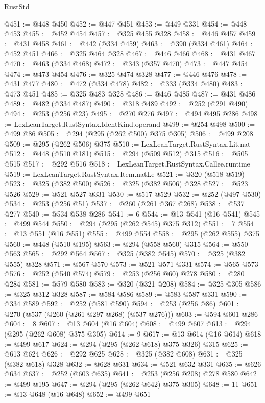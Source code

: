 \begin{lexlean}{RustStd}
\begin{coremodule}
@451 := @448 @450
@452 := @447 @451
@453 := @449 @331
@454 := @448 @453
@455 := @452 @454
@457 := @325 @455 @328
@458 := @446 @457
@459 := @431 @458
@461 := @442 (@334 @459)
@463 := @390 (@334 @461)
@464 := @452 @451
@466 := @325 @464 @328
@467 := @446 @466
@468 := @431 @467
@470 := @463 (@334 @468)
@472 := @343 (@357 @470)
@473 := @447 @454
@474 := @473 @454
@476 := @325 @474 @328
@477 := @446 @476
@478 := @431 @477
@480 := @472 (@334 @478)
@482 := @333 (@334 @480)
@483 := @473 @451
@485 := @325 @483 @328
@486 := @446 @485
@487 := @431 @486
@489 := @482 (@334 @487)
@490 := @318 @489
@492 := @252 (@291 @490)
@494 := @253 (@256 @23)
@495 := @270 @276
@497 := @494 @495 @286
@498 := LexLeanTarget.RustSyntax.IdentKind.operand
@499 := @254 @498
@500 := @499 @86
@505 := @294 (@295 (@262 @500) @375 @305)
@506 := @499 @208
@509 := @295 (@262 @506) @375
@510 := LexLeanTarget.RustSyntax.Lit.nat
@512 := @448 (@510 @181)
@515 := @294 (@509 @512) @315
@516 := @505 @515
@517 := @292 @516
@518 := LexLeanTarget.RustSyntax.Callee.runtime
@519 := LexLeanTarget.RustSyntax.Item.natLe
@521 := @320 (@518 @519)
@523 := @325 (@382 @500)
@526 := @325 (@382 @506) @328
@527 := @523 @526
@529 := @521 @527 @331
@530 := @517 @529
@532 := @252 (@497 @530)
@534 := @253 (@256 @51)
@537 := @260 (@261 @367 @268)
@538 := @537 @277
@540 := @534 @538 @286
@541 := 6
@544 := @13 @541 (@16 @541)
@545 := @499 @544
@550 := @294 (@295 (@262 @545) @375 @312)
@551 := 7
@554 := @13 @551 (@16 @551)
@555 := @499 @554
@558 := @295 (@262 @555) @375
@560 := @448 (@510 @195)
@563 := @294 (@558 @560) @315
@564 := @550 @563
@565 := @292 @564
@567 := @325 (@382 @545)
@570 := @325 (@382 @555) @328
@571 := @567 @570
@573 := @521 @571 @331
@574 := @565 @573
@576 := @252 (@540 @574)
@579 := @253 (@256 @60) @278
@580 := @280 @284
@581 := @579 @580
@583 := @320 (@321 @208)
@584 := @325 @305
@586 := @325 @312 @328
@587 := @584 @586
@589 := @583 @587 @331
@590 := @334 @589
@592 := @252 (@581 @590)
@594 := @253 (@256 @86)
@601 := @270 (@537 (@260 (@261 @297 @268) (@537 @276)))
@603 := @594 @601 @286
@604 := 8
@607 := @13 @604 (@16 @604)
@608 := @499 @607
@613 := @294 (@295 (@262 @608) @375 @305)
@614 := 9
@617 := @13 @614 (@16 @614)
@618 := @499 @617
@624 := @294 (@295 (@262 @618) @375 @326) @315
@625 := @613 @624
@626 := @292 @625
@628 := @325 (@382 @608)
@631 := @325 (@382 @618) @328
@632 := @628 @631
@634 := @521 @632 @331
@635 := @626 @634
@637 := @252 (@603 @635)
@641 := @253 (@256 @208) @278 @580
@642 := @499 @195
@647 := @294 (@295 (@262 @642) @375 @305)
@648 := 11
@651 := @13 @648 (@16 @648)
@652 := @499 @651

\end{coremodule}
\end{lexlean}
